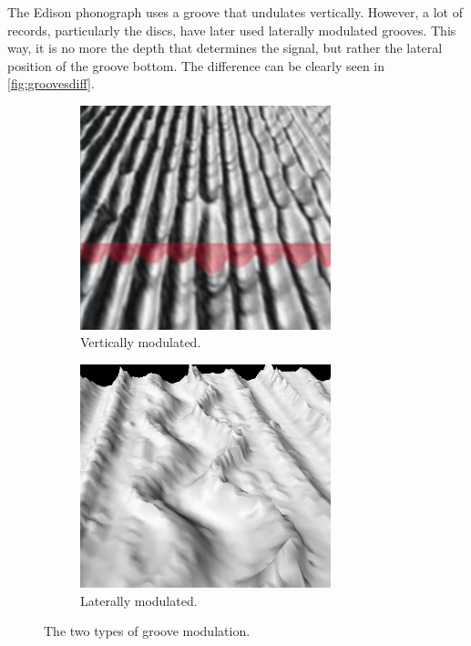 The Edison phonograph uses a groove that undulates vertically. However, a lot of records, particularly the discs, have later used laterally modulated grooves. This way, it is no more the depth that determines the signal, but rather the lateral position of the groove bottom. The difference can be clearly seen in \autoref{fig:groovesdiff}.

\begin{figure}[!ht]
    \begin{subfigure}[b]{0.49\textwidth}
    \centering
    \includegraphics[width=0.8\textwidth]{images/grooves-vertical}
    \caption{Vertically modulated.}
    \label{fig:groovesvert}
    \end{subfigure}
    \begin{subfigure}[b]{0.49\textwidth}
    \centering
    \includegraphics[width=0.8\textwidth]{images/grooves-lateral}
    \caption{Laterally modulated.}
    \label{fig:grooveslat}
    \end{subfigure}
    \caption{The two types of groove modulation.}
    \label{fig:groovesdiff}
\end{figure}

